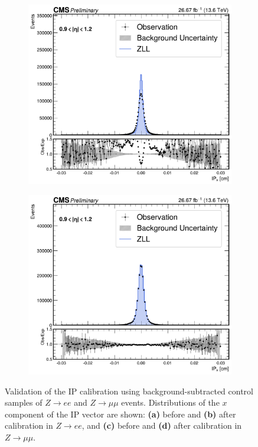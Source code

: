\begin{figure}[!htbp]
        \begin{subfigure}[b]{0.49\textwidth}
            \centering
            \includegraphics[width=\textwidth]{Figures/Chapter7/IP_Corrections/Before/mumu/ip_x_0p9to1p2_comparison_with_ratio.pdf}
            \caption{}
        \end{subfigure}
        \begin{subfigure}[b]{0.49\textwidth}
            \centering
            \includegraphics[width=\textwidth]{Figures/Chapter7/IP_Corrections/After/mumu/ip_x_0p9to1p2_comparison_with_ratio.pdf}
            \caption{}
        \end{subfigure}
    \caption[Validation of the IP calibration in $Z\to ee$ and $Z\to\mu\mu$ events.]
    {Validation of the \ac{IP} calibration using background-subtracted control samples of $Z\to ee$ and $Z\to\mu\mu$ events. 
    Distributions of the $x$ component of the IP vector are shown: \textbf{(a)} before and \textbf{(b)} after calibration in $Z\to ee$, 
    and \textbf{(c)} before and \textbf{(d)} after calibration in $Z\to\mu\mu$. }


\end{figure}
